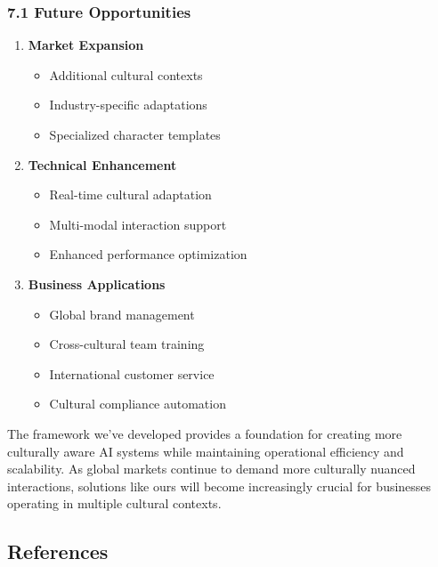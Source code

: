 \documentclass[
]{article}
\providecommand{\tightlist}{%
  \setlength{\itemsep}{0pt}\setlength{\parskip}{0pt}}
\begin{document}
\subsubsection{7.1 Future Opportunities}\label{future-opportunities}

\begin{enumerate}
\def\labelenumi{\arabic{enumi}.}
\tightlist
\item
  \textbf{Market Expansion}

  \begin{itemize}
  \tightlist
  \item
    Additional cultural contexts
  \item
    Industry-specific adaptations
  \item
    Specialized character templates
  \end{itemize}
\item
  \textbf{Technical Enhancement}

  \begin{itemize}
  \tightlist
  \item
    Real-time cultural adaptation
  \item
    Multi-modal interaction support
  \item
    Enhanced performance optimization
  \end{itemize}
\item
  \textbf{Business Applications}

  \begin{itemize}
  \tightlist
  \item
    Global brand management
  \item
    Cross-cultural team training
  \item
    International customer service
  \item
    Cultural compliance automation
  \end{itemize}
\end{enumerate}

The framework we've developed provides a foundation for creating more
culturally aware AI systems while maintaining operational efficiency and
scalability. As global markets continue to demand more culturally
nuanced interactions, solutions like ours will become increasingly
crucial for businesses operating in multiple cultural contexts.

\subsection{References}\label{references}
\end{document}
